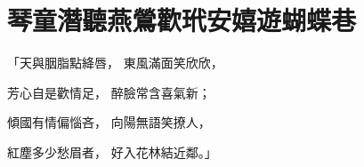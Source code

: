%

\chapter{琴童潛聽燕鶯歡\KG 玳安嬉遊蝴蝶巷}


\begin{showcontents}{}



「天與胭脂點絳唇，  東風滿面笑欣欣，

芳心自是歡情足，  醉臉常含喜氣新；

傾國有情偏惱吝，  向陽無語笑撩人，

紅塵多少愁眉者，  好入花林結近鄰。」


\end{showcontents}

